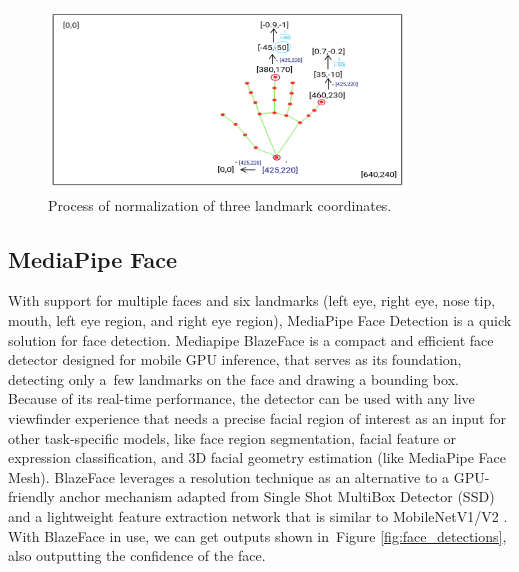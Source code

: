 \begin{figure}
	\centering
	\includegraphics[width = 0.85\textwidth]{images/normalise.pdf}
	\caption{Process of normalization of three landmark coordinates.}
		
	\label{fig:normalization}
\end{figure}

\subsection{MediaPipe Face}
With support for multiple faces and six landmarks (left eye, right eye, nose tip, mouth, left eye region, and right eye region), MediaPipe Face Detection is a quick solution for face detection. Mediapipe BlazeFace \cite{bazarevsky2019blazeface} is a compact and efficient face detector designed for mobile GPU inference, that serves as its foundation, detecting only a~few landmarks on the face and drawing a bounding box. Because of its real-time performance, the detector can be used with any live viewfinder experience that needs a precise facial region of interest as an input for other task-specific models, like face region segmentation, facial feature or expression classification, and 3D facial geometry estimation (like MediaPipe Face Mesh). BlazeFace leverages a resolution technique as an alternative to a GPU-friendly anchor mechanism adapted from Single Shot MultiBox Detector (SSD) \cite{Liu_2016} and a lightweight feature extraction network that is similar to MobileNetV1/V2 \cite{howard2017mobilenets}. With BlazeFace in use,
 we can get outputs shown in~Figure \ref{fig:face_detections}, also outputting the confidence of the face. 


